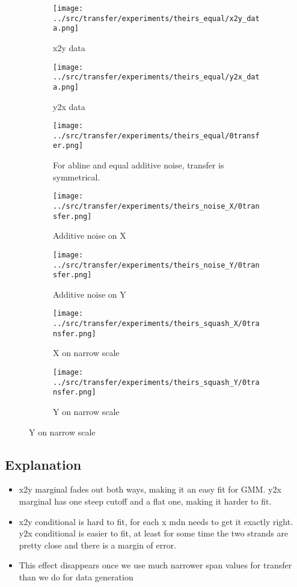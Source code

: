 \documentclass{article}
\begin{document}
\begin{figure}[H]
    \centering
    \begin{subfigure}{.32\linewidth}
        \centering
        \texttt{[image: ../src/transfer/experiments/theirs\_equal/x2y\_data.png]}
        \caption{x2y data}
    \end{subfigure}
    \begin{subfigure}{.32\linewidth}
        \centering
        \texttt{[image: ../src/transfer/experiments/theirs\_equal/y2x\_data.png]}
        \caption{y2x data}
    \end{subfigure}
    \begin{subfigure}{.32\linewidth}
        \centering
        \texttt{[image: ../src/transfer/experiments/theirs\_equal/0transfer.png]}
        \caption{For abline and equal additive noise, transfer is symmetrical.}
    \end{subfigure}
    \hfill
    \begin{subfigure}{.49\linewidth}
        \centering
        \texttt{[image: ../src/transfer/experiments/theirs\_noise\_X/0transfer.png]}
        \caption{Additive noise on X}
    \end{subfigure}
    \hfill
    \begin{subfigure}{.49\linewidth}
        \centering
        \texttt{[image: ../src/transfer/experiments/theirs\_noise\_Y/0transfer.png]}
        \caption{Additive noise on Y}
    \end{subfigure}
    \hfill
    \begin{subfigure}{.49\linewidth}
        \centering
        \texttt{[image: ../src/transfer/experiments/theirs\_squash\_X/0transfer.png]}
        \caption{X on narrow scale}
    \end{subfigure}
    \hfill
    \begin{subfigure}{.49\linewidth}
        \centering
        \texttt{[image: ../src/transfer/experiments/theirs\_squash\_Y/0transfer.png]}
        \caption{Y on narrow scale}
    \end{subfigure}
    \hfill
\end{figure}

\clearpage
\subsection{Explanation}
\begin{itemize}
    \item x2y marginal fades out both ways, making it an easy fit for GMM. y2x marginal has one steep cutoff and a flat one, making it harder to fit.
    \item x2y conditional is hard to fit, for each x mdn needs to get it exactly right. y2x conditional is easier to fit, at least for some time the two strands are pretty close and there is a margin of error.
    \item This effect disappears once we use much narrower span values for transfer than we do for data generation
\end{itemize}
\end{document}
